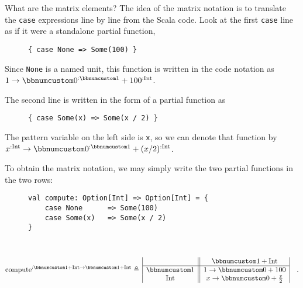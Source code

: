 What are the matrix elements? The idea of the matrix notation is to
translate the \lstinline!case! expressions line by line from the
Scala code. Look at the first \lstinline!case! line as if it were
a standalone partial function,

\begin{wrapfigure}{l}{0.45\columnwidth}%
\vspace{-0.85\baselineskip}
\begin{lstlisting}
{ case None => Some(100) }
\end{lstlisting}

\vspace{-0.75\baselineskip}
\end{wrapfigure}%

\noindent Since \lstinline!None! is a named unit, this function is
written in the code notation as $1\rightarrow\bbnum 0^{:\bbnum 1}+100^{:\text{Int}}$. 

The second line is written in the form of a partial function as

\begin{wrapfigure}{l}{0.45\columnwidth}%
\vspace{-0.85\baselineskip}
\begin{lstlisting}
{ case Some(x) => Some(x / 2) }
\end{lstlisting}

\vspace{-0.75\baselineskip}
\end{wrapfigure}%

\noindent The pattern variable on the left side is \lstinline!x!,
so we can denote that function by $x^{:\text{Int}}\rightarrow\bbnum 0^{:\bbnum 1}+(x/2)^{:\text{Int}}$. 

To obtain the matrix notation, we may simply write the two partial
functions in the two rows:

\begin{wrapfigure}{l}{0.45\columnwidth}%
\vspace{-0.85\baselineskip}
\begin{lstlisting}
val compute: Option[Int] => Option[Int] = {
    case None      => Some(100)
    case Some(x)   => Some(x / 2)
}
\end{lstlisting}

\vspace{-0.75\baselineskip}
\end{wrapfigure}%

~\vspace{-1.35\baselineskip}
\[
\text{compute}^{:\bbnum 1+\text{Int}\rightarrow\bbnum 1+\text{Int}}\triangleq\,\begin{array}{|c||c|}
 & \bbnum 1+\text{Int}\\
\hline \bbnum 1 & 1\rightarrow\bbnum 0+100\\
\text{Int} & x\rightarrow\bbnum 0+\frac{x}{2}
\end{array}\quad.
\]
\vspace{-0.9\baselineskip}

